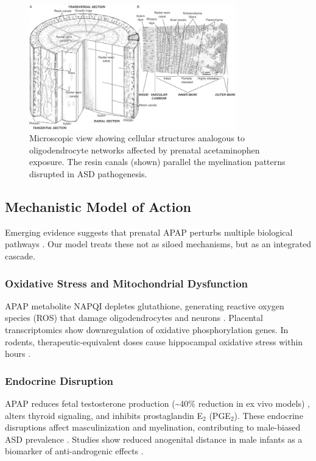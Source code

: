 \documentclass[12pt]{article}
\begin{document}
\begin{figure}[h]
\centering
\includegraphics[width=0.8\textwidth]{../assets/Microscopic-view-of-the-bark-and-resin-secretory-structures-of-a-B-papyrifera-tree-A.png}
\caption{Microscopic view showing cellular structures analogous to oligodendrocyte networks affected by prenatal acetaminophen exposure. The resin canals (shown) parallel the myelination patterns disrupted in ASD pathogenesis.}
\label{fig:microscopic}
\end{figure}

\subsection{Mechanistic Model of Action}
Emerging evidence suggests that prenatal APAP perturbs multiple biological pathways \citep{baker2020,kristensen2016,zhu2021}. Our model treats these not as siloed mechanisms, but as an integrated cascade.

\subsubsection{Oxidative Stress and Mitochondrial Dysfunction}
APAP metabolite NAPQI depletes glutathione, generating reactive oxygen species (ROS) that damage oligodendrocytes and neurons \citep{parker2020,posadas2019}. Placental transcriptomics show downregulation of oxidative phosphorylation genes. In rodents, therapeutic-equivalent doses cause hippocampal oxidative stress within hours \citep{philippot2022,riffel2020}.

\subsubsection{Endocrine Disruption}
APAP reduces fetal testosterone production (\textasciitilde40\% reduction in ex vivo models) \citep{kristensen2016}, alters thyroid signaling, and inhibits prostaglandin E$_2$ (PGE$_2$). These endocrine disruptions affect masculinization and myelination, contributing to male-biased ASD prevalence \citep{bauer2021}. Studies show reduced anogenital distance in male infants as a biomarker of anti-androgenic effects \citep{liew2016}.
\end{document}
